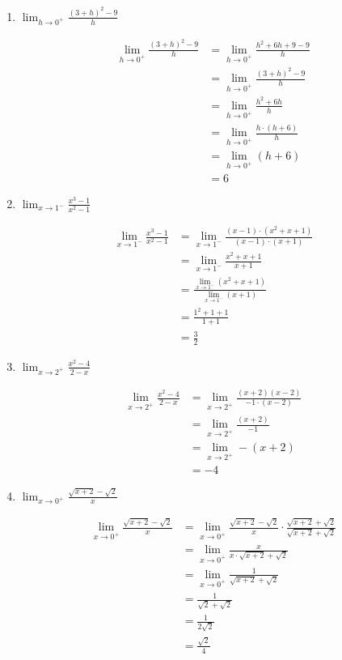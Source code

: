 \documentclass[a4paper, 12pt]{article}
\begin{document}
\begin{enumerate}
\begin{enumerate}
        \item $\lim_{h \to 0^+} \frac{(3+h)^2 - 9}{h}$
        
        \begin{align*}
            \lim_{h \to 0^+} \frac{(3+h)^2 - 9}{h} &= \lim_{h \to 0^+} \frac{h^2 +6h +9 - 9}{h}\\
            &=\lim_{h \to 0^+} \frac{(3+h)^2 - 9}{h}\\
            &= \lim_{h \to 0^+} \frac{h^2 +6h}{h}\\
            &= \lim_{h \to 0^+} \frac{h \cdot (h + 6)}{h}\\
            &= \lim_{h \to 0^+} (h+6)\\
            &= 6 \tag*{[l. pol.]}
        \end{align*}

        \item $\lim_{x \to 1^-} \frac{x^3 -1}{x^2 -1}$
        
        \begin{align*}
            \lim_{x \to 1^-} \frac{x^3 -1}{x^2 -1} &= \lim_{x \to 1^-} \frac{(x-1) \cdot (x^2 + x + 1)}{(x-1) \cdot (x+1)}\\
            &= \lim_{x \to 1^-} \frac{x^2 + x + 1}{x+1}\\
            &= \frac{\lim_{x \to 1^-}(x^2 + x + 1)}{\lim_{x \to 1^-}(x+1)} \tag*{[l. quo.]}\\
            &= \frac{1^2 + 1 + 1}{1+1} \tag*{[l. pol.]}\\
            &= \frac{3}{2}
        \end{align*}

        \item $\lim_{x \to 2^+} \frac{x^2 - 4}{2-x}$
        
        \begin{align*}
            \lim_{x \to 2^+} \frac{x^2 - 4}{2-x} &= \lim_{x \to 2^+} \frac{(x+2)(x-2)}{-1 \cdot (x-2)}\\
            &= \lim_{x \to 2^+} \frac{(x+2)}{-1}\\
            &= \lim_{x \to 2^+}-(x+2) \\
            &= -4 \tag*{[l. pol.]}
        \end{align*}

        \item $\lim_{x \to 0^+}\frac{\sqrt{x + 2} - \sqrt{2}}{x}$
        
        \begin{align*}
            \lim_{x \to 0^+}\frac{\sqrt{x + 2} - \sqrt{2}}{x} &= \lim_{x \to 0^+}\frac{\sqrt{x + 2} - \sqrt{2}}{x} \cdot \frac{\sqrt{x + 2} + \sqrt{2}}{\sqrt{x + 2} + \sqrt{2}}\\
            &= \lim_{x \to 0^+}\frac{x}{x\cdot \sqrt{x + 2} + \sqrt{2}}\\
            &= \lim_{x \to 0^+}\frac{1}{\sqrt{x + 2} + \sqrt{2}}\\
            &= \frac{1}{\sqrt{2} + \sqrt{2}} \tag*{[l. pol.]}\\
            &= \frac{1}{2\sqrt{2}}\\
            &= \frac{\sqrt{2}}{4}
        \end{align*}


\end{enumerate}
\end{enumerate}
\end{document}
